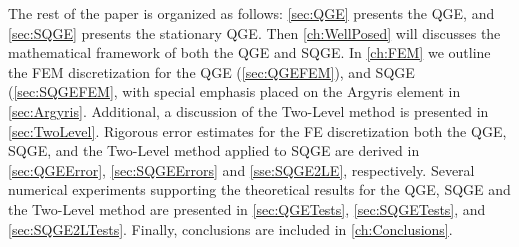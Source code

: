 The rest of the paper is organized as follows: \autoref{sec:QGE} presents the
QGE, and \autoref{sec:SQGE} presents the stationary QGE. Then
\autoref{ch:WellPosed} will discusses the mathematical framework of both the QGE
and SQGE.  In \autoref{ch:FEM} we outline the FEM discretization for the QGE
(\autoref{sec:QGEFEM}), and SQGE (\autoref{sec:SQGEFEM}, with special emphasis
placed on the Argyris element in \autoref{sec:Argyris}. Additional, a discussion
of the Two-Level method is presented in \autoref{sec:TwoLevel}. Rigorous error
estimates for the FE discretization both the QGE, SQGE, and the Two-Level method
applied to SQGE are derived in \autoref{sec:QGEError}, \autoref{sec:SQGEErrors}
and \autoref{sse:SQGE2LE}, respectively.  Several numerical experiments
supporting the theoretical results for the QGE, SQGE and the Two-Level method
are presented in \autoref{sec:QGETests}, \autoref{sec:SQGETests}, and
\autoref{sec:SQGE2LTests}. Finally, conclusions are included in
\autoref{ch:Conclusions}.

